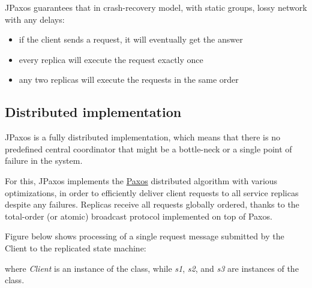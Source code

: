 JPaxos guarantees that in crash-recovery model, with static groups,
lossy network with any delays:
\begin{itemize}
\item {} 
if the client sends a request, it will eventually get the answer

\item {} 
every replica will execute the request exactly once

\item {} 
any two replicas will execute the requests in the same order

\end{itemize}


\subsection{Distributed implementation}
\label{overview:distributed-implementation}
JPaxos is a fully distributed implementation, which means that there
is no predefined central coordinator that might be a bottle-neck or a single
point of failure in the system.

For this, JPaxos implements
the \href{http://en.wikipedia.org/wiki/Paxos\_algorithm}{Paxos}
distributed algorithm with various optimizations, in order to efficiently
deliver client requests to all service replicas despite any failures.
Replicas receive all requests globally ordered, thanks to
the total-order (or atomic) broadcast protocol implemented on top
of Paxos.

Figure below shows processing of a single request message submitted
by the Client to the replicated state machine:
\begin{quote}
\begin{figure}[htbp]
\centering

\end{figure}
\end{quote}

where \emph{Client} is an instance of the  class, while \emph{s1}, \emph{s2},
and \emph{s3} are instances of the  class.

